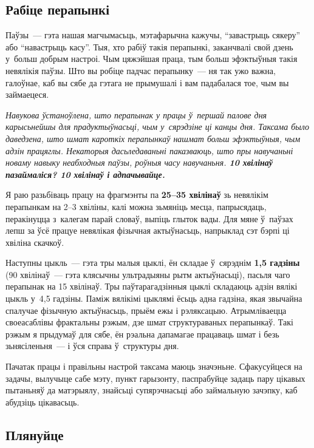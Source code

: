 
\subsection*{Рабіце перапынкі}

Паўзы~--- гэта нашая магчымасьць, мэтафарычна кажучы, ``завастрыць сякеру'' або ``навастрыць касу''. Тыя, хто рабіў такія перапынкі, заканчвалі свой дзень у~больш добрым настроі. Чым цяжэйшая праца, тым больш эфэктыўныя такія невялікія паўзы. Што вы робіце падчас перапынку~--- ня так ужо важна, галоўнае, каб вы сябе да гэтага не прымушалі і вам падабалася тое, чым вы займаецеся.

\emph{Навукова ўстаноўлена, што перапынак у працы ў~першай палове дня карысьнейшы для прадуктыўнасьці, чым у~сярэдзіне ці канцы дня. Таксама было даведзена, што шмат кароткіх перапынкаў нашмат больш эфэктыўныя, чым адзін працяглы. Некаторыя дасьледаваньні паказваюць, што пры навучаньні новаму навыку неабходныя паўзы, роўныя часу навучаньня. \textbf{10 хвілінаў пазаймаліся? 10 хвілінаў і адпачывайце.}}

Я раю разьбіваць працу на фрагмэнты па \textbf{25--35 хвілінаў} зь невялікім перапынкам на 2--3 хвіліны, калі можна зьмяніць месца, папрысядаць, перакінуцца з~калегам парай словаў, выпіць глыток вады. Для мяне ў~паўзах лепш за ўсё працуе невялікая фізычная актыўнасьць, напрыклад сэт бэрпі ці хвіліна скачкоў. 

Наступны цыкль~--- гэта тры малыя цыклі, ён складае ў~сярэднім \textbf{1,5 гадзіны} (90 хвілінаў~--- гэта клясычны ультрадыяны рытм актыўнасьці), пасьля чаго перапынак на 15 хвілінаў. Тры паўтарагадзінныя цыклі складаюць адзін вялікі цыкль у~4,5 гадзіны. Паміж вялікімі цыклямі ёсьць адна гадзіна, якая звычайна спалучае фізычную актыўнасьць, прыём ежы і рэляксацыю. Атрымліваецца своеасаблівы фрактальны рэжым, дзе шмат структураваных перапынкаў. Такі рэжым я прыдумаў для сябе, ён рэальна дапамагае працаваць шмат і безь зьнясіленьня~--- і ўся справа ў~структуры дня.

Пачатак працы і правільны настрой таксама маюць значэньне. Сфакусуйцеся на задачы, вылучыце сабе мэту, пункт гарызонту, паспрабуйце задаць пару цікавых пытаньняў да матэрыялу, знайсьці супярэчнасьці або займальную зачэпку, каб абудзіць цікавасьць.

\subsection*{Плянуйце}


